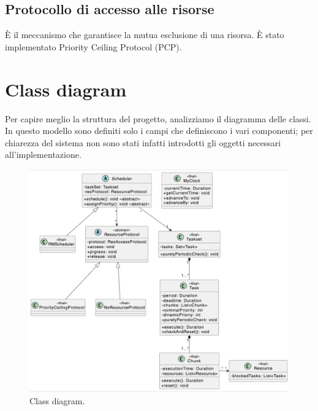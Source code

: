 \subsection{Protocollo di accesso alle risorse}
È il meccanismo che garantisce la mutua esclusione di una risorsa. È stato implementato Priority Ceiling Protocol (PCP).

\section{Class diagram}
Per capire meglio la struttura del progetto, analizziamo il diagramma delle classi. In questo modello sono definiti solo i campi che definiscono i vari componenti; per chiarezza del sistema non sono stati infatti introdotti gli oggetti necessari all'implementazione.
\begin{figure}[htbp]
    \centering
    \includegraphics[width=1\textwidth]{immagini/class diagram.pdf}
    \caption{Class diagram.}
\end{figure}